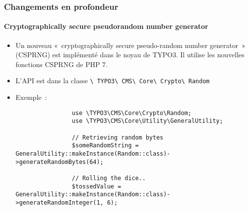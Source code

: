 \begin{frame}[fragile]
	\frametitle{Changements en profondeur}
	\framesubtitle{Cryptographically secure pseudorandom number generator}

	\lstset{basicstyle=\tiny\ttfamily}

	\begin{itemize}

		\item Un nouveau «~cryptographically secure pseudo-random number generator~» (CSPRNG) est
			implémenté dans le noyau de TYPO3.\newline
			Il utilise les nouvelles fonctions CSPRNG de PHP 7.

		\item L'API est dans la classe
			\texttt{\textbackslash
				TYPO3\textbackslash
				CMS\textbackslash
				Core\textbackslash
				Crypto\textbackslash
				Random}

		\item Exemple~:

			\begin{lstlisting}
				use \TYPO3\CMS\Core\Crypto\Random;
				use \TYPO3\CMS\Core\Utility\GeneralUtility;

				// Retrieving random bytes
				$someRandomString = GeneralUtility::makeInstance(Random::class)->generateRandomBytes(64);

				// Rolling the dice..
				$tossedValue = GeneralUtility::makeInstance(Random::class)->generateRandomInteger(1, 6);
			\end{lstlisting}

	\end{itemize}

\end{frame}

